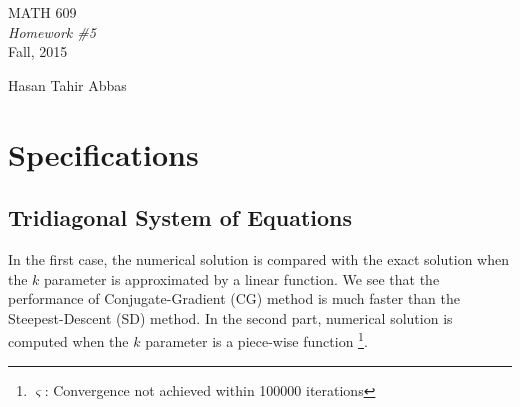 \documentclass[11pt]{article}
\author{Hasan Tahir Abbas}
\begin{document}
\begin{titlepage}

\vspace*{55mm}
\begin{center}
{\huge MATH 609}\\[1cm]
{\em \huge Homework \#5}\\[70mm]
{\large Fall, 2015} \\[15mm]
\end{center}

\begin{flushright}
{\LARGE Hasan Tahir Abbas}
\end{flushright}

\vfill

\end{titlepage}
%
%
%
%
\newpage
\section{Specifications}
\subsection{Tridiagonal System of Equations }

In the first case, the numerical solution is compared with the exact solution when the $k$ parameter is approximated by a linear function. We see that the performance of Conjugate-Gradient (CG) method is much faster than the Steepest-Descent (SD) method. In the second part, numerical solution is computed when the $k$ parameter is a piece-wise function \footnote{$\varsigma$: Convergence not achieved within 100000 iterations}.
\end{document}
